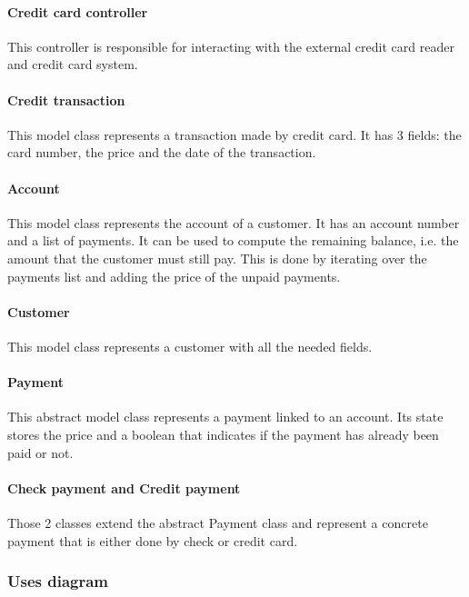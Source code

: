\paragraph{Credit card controller}
This controller is responsible for interacting with the external credit card reader and credit card system. 

\paragraph{Credit transaction}
This model class represents a transaction made by credit card. It has 3 fields: the card number, the price and the date of the transaction.

\paragraph{Account}
This model class represents the account of a customer. It has an account number and a list of payments.
It can be used to compute the remaining balance, i.e. the amount that the customer must still pay. This is done by iterating over the payments list and adding the price of the unpaid payments.

\paragraph{Customer}
This model class represents a customer with all the needed fields.

\paragraph{Payment}
This abstract model class represents a payment linked to an account. Its state stores the price and a boolean that indicates if the payment has already been paid or not.

\paragraph{Check payment and Credit payment}
Those 2 classes extend the abstract Payment class and represent a concrete payment that is either done by check or credit card.


\subsubsection{Uses diagram}

